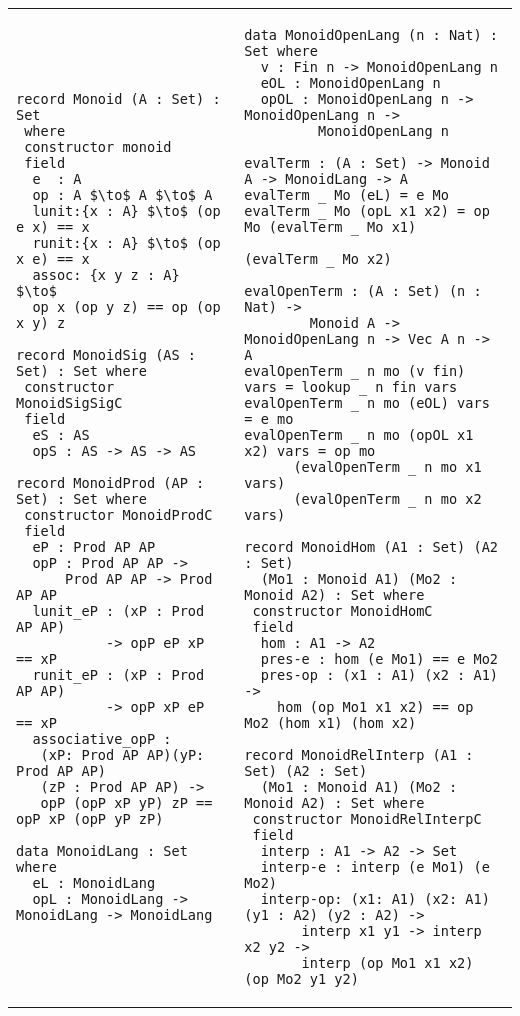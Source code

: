 \begin{adjustbox}{width=\columnwidth,center}
    \begin{tabular}{p{10cm} p{12cm}}        
\lstset{backgroundcolor=\color{ourblue}}
\begin{lstlisting}[mathescape]
record Monoid (A : Set) : Set 
 where
 constructor monoid
 field
  e  : A
  op : A $\to$ A $\to$ A
  lunit:{x : A} $\to$ (op e x) == x
  runit:{x : A} $\to$ (op x e) == x
  assoc: {x y z : A} $\to$ 
  op x (op y z) == op (op x y) z
\end{lstlisting}
\lstset{backgroundcolor=\color{ourpink}}
\begin{lstlisting}[mathescape]
record MonoidSig (AS : Set) : Set where
 constructor MonoidSigSigC
 field
  eS : AS
  opS : AS -> AS -> AS
  
record MonoidProd (AP : Set) : Set where
 constructor MonoidProdC
 field
  eP : Prod AP AP
  opP : Prod AP AP ->
      Prod AP AP -> Prod AP AP
  lunit_eP : (xP : Prod AP AP) 
           -> opP eP xP == xP
  runit_eP : (xP : Prod AP AP) 
           -> opP xP eP == xP
  associative_opP :
   (xP: Prod AP AP)(yP: Prod AP AP)
   (zP : Prod AP AP) ->
   opP (opP xP yP) zP == opP xP (opP yP zP)
   
data MonoidLang : Set where
  eL : MonoidLang
  opL : MonoidLang -> MonoidLang -> MonoidLang 
\end{lstlisting}
&

\lstset{backgroundcolor=\color{ourpink}}
\begin{lstlisting}[mathescape]
data MonoidOpenLang (n : Nat) : Set where
  v : Fin n -> MonoidOpenLang n
  eOL : MonoidOpenLang n
  opOL : MonoidOpenLang n -> MonoidOpenLang n -> 
         MonoidOpenLang n

evalTerm : (A : Set) -> Monoid A -> MonoidLang -> A
evalTerm _ Mo (eL) = e Mo
evalTerm _ Mo (opL x1 x2) = op Mo (evalTerm _ Mo x1) 
                                  (evalTerm _ Mo x2)

evalOpenTerm : (A : Set) (n : Nat) -> 
        Monoid A -> MonoidOpenLang n -> Vec A n -> A
evalOpenTerm _ n mo (v fin) vars = lookup _ n fin vars        
evalOpenTerm _ n mo (eOL) vars = e mo
evalOpenTerm _ n mo (opOL x1 x2) vars = op mo
      (evalOpenTerm _ n mo x1 vars)
      (evalOpenTerm _ n mo x2 vars)

record MonoidHom (A1 : Set) (A2 : Set) 
  (Mo1 : Monoid A1) (Mo2 : Monoid A2) : Set where
 constructor MonoidHomC
 field
  hom : A1 -> A2
  pres-e : hom (e Mo1) == e Mo2
  pres-op : (x1 : A1) (x2 : A1) -> 
    hom (op Mo1 x1 x2) == op Mo2 (hom x1) (hom x2)

record MonoidRelInterp (A1 : Set) (A2 : Set)
  (Mo1 : Monoid A1) (Mo2 : Monoid A2) : Set where
 constructor MonoidRelInterpC
 field
  interp : A1 -> A2 -> Set
  interp-e : interp (e Mo1) (e Mo2)
  interp-op: (x1: A1) (x2: A1) (y1 : A2) (y2 : A2) ->
       interp x1 y1 -> interp x2 y2 ->
       interp (op Mo1 x1 x2) (op Mo2 y1 y2)
\end{lstlisting}
\end{tabular}  
\end{adjustbox}

